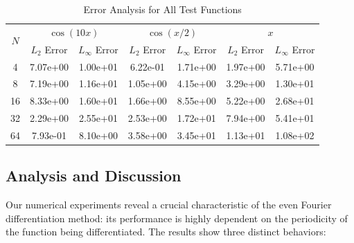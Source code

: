 \documentclass{article}
\begin{document}
\begin{table}[h]
\centering
\caption{Error Analysis for All Test Functions}
\label{tab:error_analysis}
\begin{tabular}{c*{6}{c}}
\toprule
\multirow{2}{*}{$N$} & \multicolumn{2}{c}{$\cos(10x)$} & \multicolumn{2}{c}{$\cos(x/2)$} & \multicolumn{2}{c}{$x$} \\
\cmidrule(lr){2-3} \cmidrule(lr){4-5} \cmidrule(lr){6-7}
 & $L_2$ Error & $L_\infty$ Error & $L_2$ Error & $L_\infty$ Error & $L_2$ Error & $L_\infty$ Error \\
\midrule
4 & 7.07e+00 & 1.00e+01 & 6.22e-01 & 1.71e+00 & 1.97e+00 & 5.71e+00 \\
8 & 7.19e+00 & 1.16e+01 & 1.05e+00 & 4.15e+00 & 3.29e+00 & 1.30e+01 \\
16 & 8.33e+00 & 1.60e+01 & 1.66e+00 & 8.55e+00 & 5.22e+00 & 2.68e+01 \\
32 & 2.29e+00 & 2.55e+01 & 2.53e+00 & 1.72e+01 & 7.94e+00 & 5.41e+01 \\
64 & 7.93e-01 & 8.10e+00 & 3.58e+00 & 3.45e+01 & 1.13e+01 & 1.08e+02 \\
\bottomrule
\end{tabular}
\end{table}

\subsection{Analysis and Discussion}

Our numerical experiments reveal a crucial characteristic of the even Fourier differentiation method: its performance is highly dependent on the periodicity of the function being differentiated. The results show three distinct behaviors:
\end{document}
